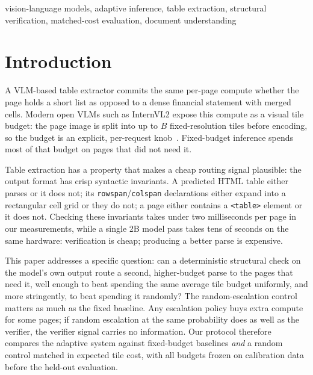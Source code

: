 \documentclass[conference]{IEEEtran}
\begin{document}
\begin{IEEEkeywords}
vision-language models, adaptive inference, table extraction, structural
verification, matched-cost evaluation, document understanding
\end{IEEEkeywords}

\section{Introduction}
\label{sec:intro}

A VLM-based table extractor commits the same per-page compute whether the
page holds a short list as opposed to a dense financial statement with merged
cells. Modern open VLMs such as InternVL2 expose this compute as a visual
tile budget: the page image is split into up to $B$ fixed-resolution tiles
before encoding, so the budget is an explicit, per-request
knob~\cite{chen2024internvl,chen2024internvl15}. Fixed-budget inference
spends most of that budget on pages that did not need it.

Table extraction has a property that makes a cheap routing signal
plausible: the output format has crisp syntactic invariants. A predicted
HTML table either parses or it does not; its
\texttt{rowspan}/\texttt{colspan} declarations either expand into a
rectangular cell grid or they do not; a page either contains a
\texttt{<table>} element or it does not. Checking these invariants takes
under two milliseconds per page in our measurements, while a single 2B
model pass takes tens of seconds on the same hardware: verification is
cheap; producing a better parse is expensive.

This paper addresses a specific question: can a deterministic structural
check on the model's own output route a second, higher-budget parse to
the pages that need it, well enough to beat spending the same average
tile budget uniformly, and more stringently, to beat spending it
randomly? The random-escalation control matters as much as the fixed
baseline. Any escalation policy buys extra compute for some pages; if
random escalation at the same probability does as well as the
verifier, the verifier signal carries no information. Our protocol
therefore compares the adaptive system against fixed-budget baselines
\emph{and} a random control matched in expected tile cost, with all
budgets frozen on calibration data before the held-out evaluation.
\end{document}
